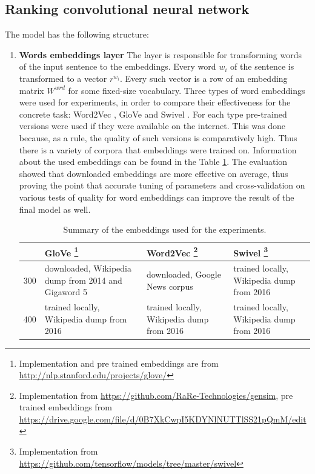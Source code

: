 \subsection{Ranking convolutional neural network}
The model has the following structure:
\begin{enumerate}
\item \textbf{Words embeddings layer} The layer is responsible for transforming words of the input sentence to the embeddings. Every word $w_i$ of the sentence is transformed to a vector $r^{w_i}$. Every such vector is a row of an 
embedding matrix $W^{wrd}$ for some fixed-size vocabulary.
  Three types of word embeddings were used for experiments, in order to compare their effectiveness for the concrete task: 
   Word2Vec \cite{NIPS2013_5021}, GloVe \cite{pennington2014glove} and Swivel \cite{DBLP:journals/corr/ShazeerDEW16}. For each type 
  pre-trained versions were used if they were available on the internet. This was done because, as a rule, the quality of such versions is 
  comparatively high. Thus there is a variety of corpora that embeddings were trained 
  on. Information about the used embeddings can be found in the Table \ref{tab:emb}. The evaluation 
  showed that downloaded embeddings are more effective on average, thus proving the point 
  that accurate tuning of parameters and cross-validation on various tests of quality for word 
  embeddings can improve the result of the final model as well.
  
  \begin{table}
  \begin{center}
 \begin{tabular}{ | l | p{3.5cm} | p{3.5cm} | p{3.5cm} | }
    \hline
     & GloVe \footnote{Implementation and pre trained embeddings are from \url{http://nlp.stanford.edu/projects/glove/}} & Word2Vec \footnote{Implementation from \url{https://github.com/RaRe-Technologies/gensim}, pre trained embeddings from \url{https://drive.google.com/file/d/0B7XkCwpI5KDYNlNUTTlSS21pQmM/edit}} & Swivel \footnote{Implementation from \url{https://github.com/tensorflow/models/tree/master/swivel}} \\ \hline
    300 & downloaded, Wikipedia dump from 2014 and Gigaword 5 & downloaded, Google News corpus & trained locally, Wikipedia dump from 2016 \\ \hline
    400 & trained locally, Wikipedia dump from 2016 & trained locally, Wikipedia dump from 2016 & trained locally, Wikipedia dump from 2016 \\ \hline
    \end{tabular}
\caption[The word embeddings used for the experiments]{Summary of the embeddings used for the experiments.}
\label{tab:emb}
\end{center}
\end{table}


\end{enumerate}
